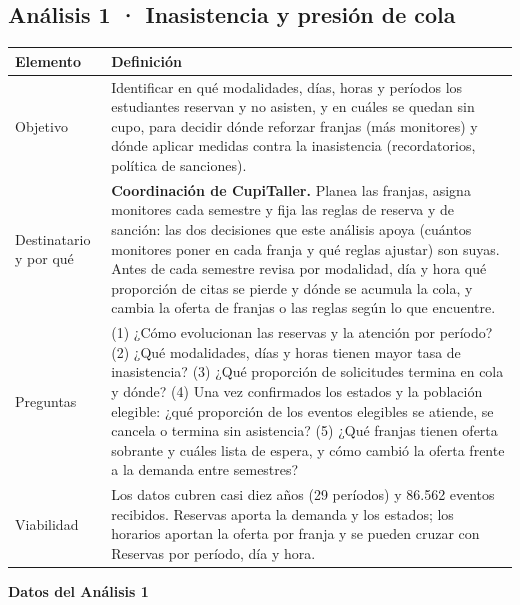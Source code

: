 \documentclass[11pt,letterpaper]{article}
\begin{document}
\subsection{Análisis 1 · Inasistencia y presión de cola}

\begingroup\small\setlength{\tabcolsep}{4pt}\renewcommand{\arraystretch}{1.15}
\begin{longtable}{>{\raggedright\arraybackslash}p{}>{\raggedright\arraybackslash}p{}}
\toprule
\textbf{Elemento} & \textbf{Definición} \\
\midrule
\endhead
Objetivo & Identificar en qué modalidades, días, horas y períodos los estudiantes reservan y no asisten, y en cuáles se quedan sin cupo, para decidir dónde reforzar franjas (más monitores) y dónde aplicar medidas contra la inasistencia (recordatorios, política de sanciones). \\
Destinatario y por qué & \textbf{Coordinación de CupiTaller.} Planea las franjas, asigna monitores cada semestre y fija las reglas de reserva y de sanción: las dos decisiones que este análisis apoya (cuántos monitores poner en cada franja y qué reglas ajustar) son suyas. Antes de cada semestre revisa por modalidad, día y hora qué proporción de citas se pierde y dónde se acumula la cola, y cambia la oferta de franjas o las reglas según lo que encuentre. \\
Preguntas & (1) ¿Cómo evolucionan las reservas y la atención por período? (2) ¿Qué modalidades, días y horas tienen mayor tasa de inasistencia? (3) ¿Qué proporción de solicitudes termina en cola y dónde? (4) Una vez confirmados los estados y la población elegible: ¿qué proporción de los eventos elegibles se atiende, se cancela o termina sin asistencia? (5) ¿Qué franjas tienen oferta sobrante y cuáles lista de espera, y cómo cambió la oferta frente a la demanda entre semestres? \\
Viabilidad & Los datos cubren casi diez años (29 períodos) y 86.562 eventos recibidos. Reservas aporta la demanda y los estados; los horarios aportan la oferta por franja y se pueden cruzar con Reservas por período, día y hora. \\
\bottomrule
\end{longtable}
\endgroup


\textbf{Datos del Análisis 1}
\end{document}
